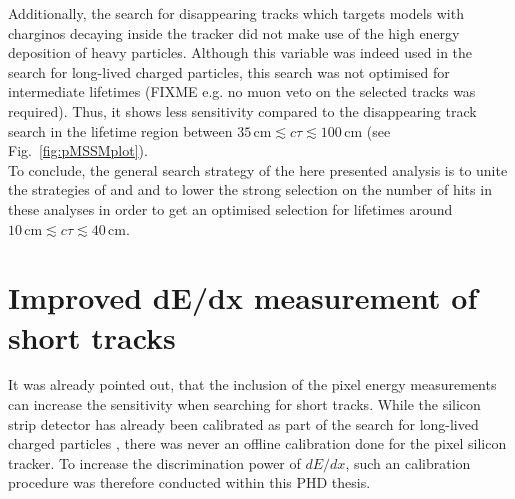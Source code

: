Additionally, the search for disappearing tracks which targets models with charginos decaying inside the tracker did not make use of the high energy deposition of heavy particles. 
Although this variable was indeed used in the search for long-lived charged particles, this search was not optimised for intermediate lifetimes (FIXME e.g. no muon veto on the selected tracks was required). 
Thus, it shows less sensitivity compared to the disappearing track search in the lifetime region between $35\,\text{cm} \lesssim c\tau \lesssim 100\,\text{cm}$ (see Fig.~\ref{fig:pMSSMplot}).\\

To conclude, the general search strategy of the here presented analysis is to unite the strategies of \cite{bib:CMS:HSCP_8TeV} and \cite{bib:CMS:DT_8TeV} and to lower the strong selection on the number of hits in these analyses 
in order to get an optimised selection for lifetimes around $10\,\text{cm} \lesssim c\tau \lesssim  40\,\text{cm}$.

\chapter{Improved dE/dx measurement of short tracks}
\label{sec:DeDxMeasurement}
It was already pointed out, that the inclusion of the pixel energy measurements can increase the sensitivity when searching for short tracks.
While the silicon strip detector has already been calibrated as part of the search for long-lived charged particles \cite{bib:CMS:HSCP_8TeV}, there was never an offline calibration done for the pixel silicon tracker.
To increase the discrimination power of $dE/dx$, such an calibration procedure was therefore conducted within this PHD thesis.
